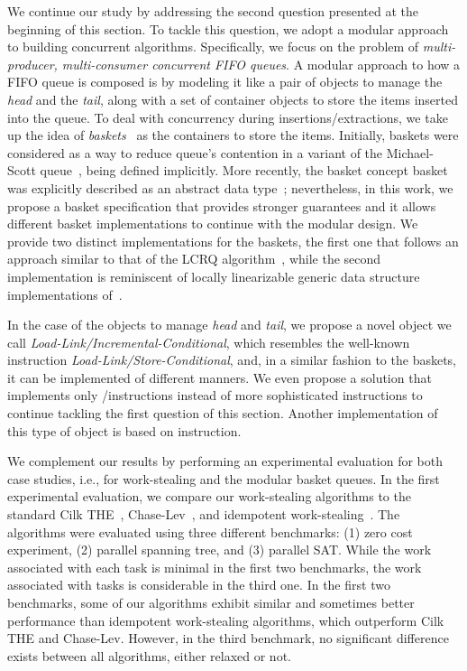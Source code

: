 We continue our study by addressing the second question presented at the beginning of this section. To tackle this question, we adopt a modular approach to building concurrent algorithms. Specifically, we focus on the problem of \textit{multi-producer, multi-consumer concurrent FIFO queues}. A modular approach to how a FIFO queue is composed is by modeling it like a pair of objects to manage the \textit{head} and the \textit{tail}, along with a set of container objects to store the items inserted into the queue. To deal with concurrency during insertions/extractions, we take up the idea of \textit{baskets}~\cite{basketqueue2007} as the containers to store the items. Initially, baskets were considered as a way to reduce queue's \CAS contention in a variant of the Michael-Scott queue~\cite{DBLP_conf_podc_MichaelS96}, being defined implicitly. More recently, the basket concept basket was explicitly described as an abstract data type~\cite{scalingconcurrent2020}; nevertheless, in this work, we propose a basket specification that provides stronger guarantees and it allows different basket implementations to continue with the modular design. We provide two distinct implementations for the baskets, the first one that follows an approach similar to that of the LCRQ algorithm~\cite{ppopp2013x86queues}, while the second implementation is reminiscent of locally linearizable generic data structure implementations of~\cite{DBLP_conf_concur_HaasHHKLPSSV16}.

 In the case of the objects to manage \textit{head} and \textit{tail}, we propose a novel object we call \textit{Load-Link/Incremental-Conditional}, which resembles the well-known instruction \textit{Load-Link/Store-Conditional}, and, in a similar fashion to the baskets, it can be implemented of different manners. We even propose a solution that implements only \R/\W instructions instead of more sophisticated \RMW instructions to continue tackling the first question of this section. Another implementation of this type of object is based on \CAS instruction.

 We complement our results by performing an experimental evaluation for both case studies, i.e., for work-stealing and the modular basket queues. In the first experimental evaluation, we compare our work-stealing algorithms to the standard Cilk THE~\cite{DBLP_conf_pldi_FrigoLR98}, Chase-Lev~\cite{circular.work.stealing}, and idempotent work-stealing~\cite{maged.vechev.2009}. The algorithms were evaluated using three different benchmarks: (1) zero cost experiment, (2) parallel spanning tree, and (3) parallel SAT. While the work associated with each task is minimal in the first two benchmarks, the work associated with tasks is considerable in the third one. In the first two benchmarks, some of our algorithms exhibit similar and sometimes better performance than idempotent work-stealing algorithms, which outperform Cilk THE and Chase-Lev. However, in the third benchmark, no significant difference exists between all algorithms, either relaxed or not.

